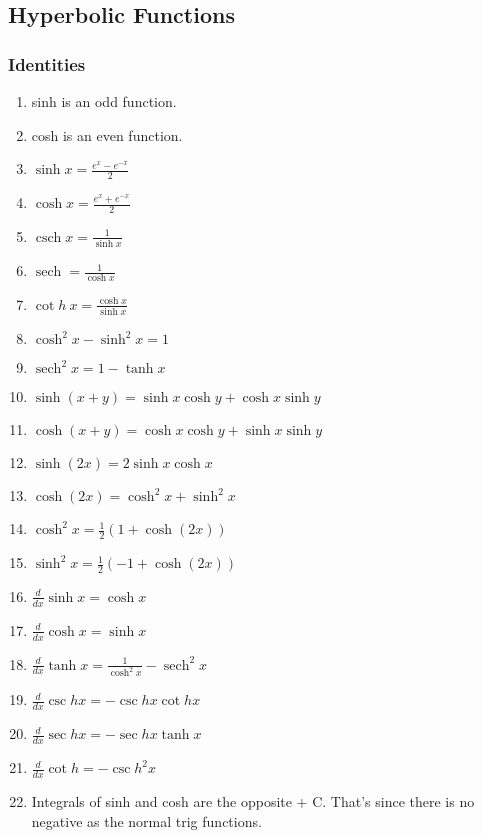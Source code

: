 \documentclass{article}
\DeclareMathOperator{\sech}{sech}
\DeclareMathOperator{\csch}{csch}
\begin{document}
	\newpage

	\subsection{Hyperbolic Functions}

	\subsubsection{Identities}
	\begin{enumerate}[1.]
		\item sinh is an odd function.
		\item cosh is an even function.
		\item $	\sinh x = \frac{ e^x - e^{-x}}{ 2  }$
		\item $	\cosh x = \frac{ e^x + e^{-x}}{ 2} $
		\item $	\csch x = \frac{1}{\sinh x} $
		\item ${\sech} = \frac{1}{\cosh x} $
		\item $ \cot{h}\ x = \frac{\cosh x}{\sinh x} $ 
		\item $ \cosh^2 x - \sinh^2x = 1 $
		\item $\sech^2 x = 1- \tanh x$
		\item $ \sinh(x+y) = \sinh x \cosh y + \cosh x \sinh y $
		\item $ \cosh(x+y) = \cosh x \cosh y + \sinh x \sinh y $
		\item $ \sinh(2x) = 2 \sinh x \cosh x$ 
		\item $ \cosh(2x) = \cosh^2x+ \sinh^2x $ 
		\item $ \cosh^2x = \frac{1}{2} (1+ \cosh(2x)) $ 
		\item $ \sinh^2x = \frac{1}{2} (-1+ \cosh(2x)) $ 


		\item 		
			$	\frac{d}{dx} \sinh x = \cosh x $
		\item $ \frac{d}{dx} \cosh x = \sinh x $ 
		\item $ \frac{d}{dx} \tanh x = \frac{1}{\cosh^2 x} - \sech^2 x $
		\item $ \frac{d}{dx} \csc h x = - \csc h x \cot h x $ 
		\item $ \frac{d}{dx} \sec h x = - \sec h x \tanh x $ 
		\item $ \frac{d}{dx} \cot h = - \csc h ^2 x $
		\item Integrals of sinh and cosh are the opposite + C. That's since there is no negative as the normal trig functions.



\end{enumerate}
\end{document}
